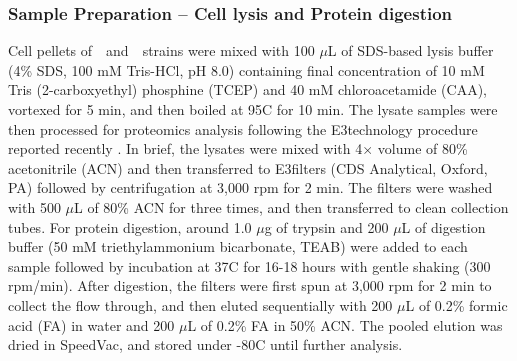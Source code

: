 \subsubsection{Sample Preparation -- Cell lysis and Protein digestion} %

Cell pellets of~\syn~and~\syna~strains were mixed with 100 $\mu$L of SDS-based lysis buffer (4\% SDS, 100 mM Tris-HCl, pH 8.0) containing final concentration of 10 mM Tris (2-carboxyethyl) phosphine (TCEP) and 40 mM chloroacetamide (CAA), vortexed for 5 min, and then boiled at 95\textdegree C for 10 min. The lysate samples were then processed for proteomics analysis following the E3technology procedure reported recently \citep{martin_development_2024}. In brief, the lysates were mixed with 4$\times$ volume of 80\% acetonitrile (ACN) and then transferred to E3filters (CDS Analytical, Oxford, PA) followed by centrifugation at 3,000 rpm for 2 min. The filters were washed with 500 $\mu$L of 80\% ACN for three times, and then transferred to clean collection tubes. For protein digestion, around 1.0 $\mu$g of trypsin and 200 $\mu$L of digestion buffer (50 mM triethylammonium bicarbonate, TEAB) were added to each sample followed by incubation at 37\textdegree C for 16-18 hours with gentle shaking (300 rpm/min). After digestion, the filters were first spun at 3,000 rpm for 2 min to collect the flow through, and then eluted sequentially with 200 $\mu$L of 0.2\% formic acid (FA) in water and 200 $\mu$L of 0.2\% FA in 50\% ACN. The pooled elution was dried in SpeedVac, and stored under -80\textdegree C until further analysis. 

